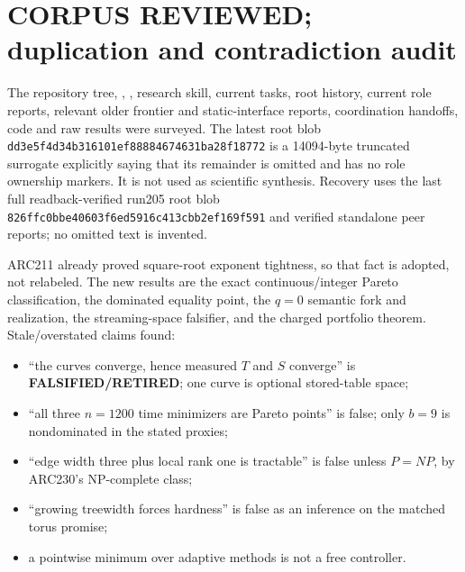 \documentclass[11pt]{article}
\begin{document}
\section{CORPUS REVIEWED; duplication and contradiction audit}
The repository tree, , , research skill,
current tasks, root history, current role reports, relevant older frontier and
static-interface reports, coordination handoffs, code and raw results were
surveyed.  The latest root  blob
\texttt{dd3e5f4d34b316101ef88884674631ba28f18772} is a 14094-byte truncated
surrogate explicitly saying that its remainder is omitted and has no role
ownership markers.  It is not used as scientific synthesis.  Recovery uses
the last full readback-verified run205 root blob
\texttt{826ffc0bbe40603f6ed5916c413cbb2ef169f591} and verified standalone peer
reports; no omitted text is invented.

ARC211 already proved square-root exponent tightness, so that fact is adopted,
not relabeled.  The new results are the exact continuous/integer Pareto
classification, the dominated equality point, the $q=0$ semantic fork and
realization, the streaming-space falsifier, and the charged portfolio theorem.
Stale/overstated claims found:
\begin{itemize}
\item ``the curves converge, hence measured $T$ and $S$ converge'' is
\textbf{FALSIFIED/RETIRED}; one curve is optional stored-table space;
\item ``all three $n=1200$ time minimizers are Pareto points'' is false; only
$b=9$ is nondominated in the stated proxies;
\item ``edge width three plus local rank one is tractable'' is false unless
$P=NP$, by ARC230's NP-complete class;
\item ``growing treewidth forces hardness'' is false as an inference on the
matched torus promise;
\item a pointwise minimum over adaptive methods is not a free controller.
\end{itemize}
\end{document}
